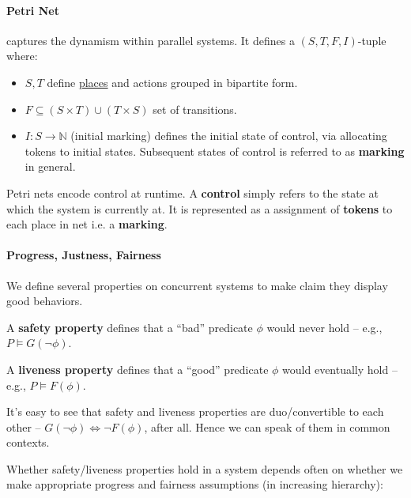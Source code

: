\documentclass[99-notes-packed.tex]{subfiles}
\begin{document}
\paragraph*{Petri Net} captures the dynamism within parallel systems. It defines a $(S, T, F, I)$-tuple where: 
\begin{itemize}
    \item $S, T$ define \underline{places} and actions grouped in bipartite form. 
    \item $F \subseteq (S \times T) \cup (T \times S)$ set of transitions.
    \item $I: S \rightarrow \mathbb{N}$ (initial marking) defines the initial state of control, via allocating tokens to initial states. Subsequent states of control is referred to as \textbf{marking} in general.
\end{itemize}

\begin{definition}
    Petri nets encode control at runtime. A \textbf{control} simply refers to the state at which the system is currently at. It is represented as a assignment of \textbf{tokens} to each place in net i.e. a \textbf{marking}. 
\end{definition}

\paragraph*{Progress, Justness, Fairness} We define several properties on concurrent systems to make claim they display good behaviors. 

\begin{definition}[Safety]
    A \textbf{safety property} defines that a ``bad'' predicate $\phi$ would never hold -- e.g., $P \models G(\neg \phi)$. 
\end{definition}

\begin{definition}[Liveness]
    A \textbf{liveness property} defines that a ``good'' predicate $\phi$ would eventually hold -- e.g., $P \models F(\phi)$. 
\end{definition}

It's easy to see that safety and liveness properties are duo/convertible to each other -- $G(\neg \phi) \iff \neg F(\phi)$, after all. Hence we can speak of them in common contexts.

Whether safety/liveness properties hold in a system depends often on whether we make appropriate progress and fairness assumptions (in increasing hierarchy): 
\end{document}
